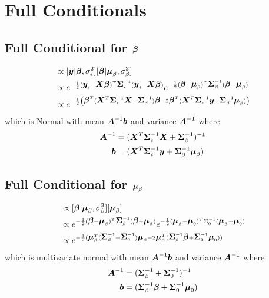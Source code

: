 \documentclass[fleqn]{article}
\def\bm#1{\mbox{\boldmath $#1$}}
\begin{document}
\section{Full Conditionals}
%
\subsection{Full Conditional for $\bm{\beta}$}
%
\begin{align*}
[\bm{\beta} | \cdot] & \propto [\bm{y} | \bm{\beta}, \sigma^2_\epsilon] [\bm{\beta} | \bm{\mu}_\beta, \sigma^2_\beta]\\
%
& \propto e^{ - \frac{1} {2} (\bm{y}_i - \bm{X} \bm{\beta})^T \bm{\Sigma}_\epsilon^{ - 1} (\bm{y}_i - \bm{X} \bm{\beta})} e^{ - \frac{1} {2} (\bm{\beta} - \bm{\mu}_\beta)^T \bm{\Sigma}_\beta^{ - 1} (\bm{\beta} - \bm{\mu}_\beta)}\\
%
& \propto e^{ - \frac{1} {2} \left( \bm{\beta}^T (\bm{X}^T \bm{\Sigma}_\epsilon^{ - 1} \bm{X} + \bm{\Sigma}_\beta^{ - 1}) \bm{\beta} - 2 \bm{\beta}^T (\bm{X}^T \bm{\Sigma}_\epsilon^{ - 1} \bm{y} + \bm{\Sigma}_\beta^{ - 1} \bm{\mu}_\beta) \right) }\\
\end{align*}
%
which is Normal with mean $ \bm{A}^{ - 1} \bm{b}$ and variance $\bm{A}^{ - 1}$ where
\begin{align*}
  \bm{A}^{ - 1} & = (\bm{X}^T \bm{\Sigma}_\epsilon^{ - 1} \bm{X} + \bm{\Sigma}_\beta^{ - 1})^{ - 1}\\
  \bm{b} & = (\bm{X}^T \bm{\Sigma}_{\epsilon}^{ - 1} \bm{y} + \bm{\Sigma}_\beta^{ - 1} \bm{\mu}_\beta)\\
\end{align*}
%
\subsection{Full Conditional for $\bm{\mu}_\beta$}
%
\begin{align*}
[\bm{\mu}_\beta | \cdot] & \propto [\bm{\beta} | \bm{\mu}_\beta, \sigma^2_\beta] [\bm{\mu}_\beta]\\
%
& \propto e^{ - \frac{1} {2} (\bm{\beta} - \bm{\mu}_\beta)^T \bm{\Sigma}_\beta^{ - 1} (\bm{\beta} - \bm{\mu}_\beta)} e^{ - \frac{1} {2} (\bm{\mu}_\beta - \bm{\mu}_0)^T \Sigma_0^{ - 1} (\bm{\mu}_\beta - \bm{\mu}_0)}\\
%
& \propto e^{ - \frac{1} {2} (
\bm{\mu}_\beta^T (\bm{\Sigma}_\beta^{ - 1} + \bm{\Sigma}_0^{ - 1}) \bm{\mu}_\beta - 2 \bm{\mu}_\beta^T (\bm{\Sigma}_\beta^{ - 1} \bm{\beta} + \bm{\Sigma}_0^{ - 1} \bm{\mu}_0) ) }
\end{align*}
%
which is multivariate normal with mean $\bm{A}^{ - 1} \bm{b}$ and variance $\bm{A}^{ - 1}$ where
\begin{align*}
\bm{A}^{ - 1} & = (\bm{\Sigma}_\beta^{ - 1} + \bm{\Sigma}_0^{ - 1})^{ - 1}\\
\bm{b} & =  
(\bm{\Sigma}_\beta^{ - 1} \bm{\beta} + \bm{\Sigma}_0^{ - 1} \bm{\mu}_0)
\end{align*}
%
\end{document}
